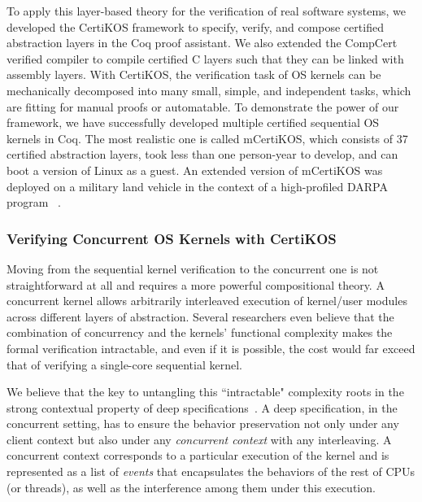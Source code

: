 \documentclass[a4paper, 10pt]{article}
\begin{document}
\begin{small}
To apply this layer-based theory for the verification of real software systems,
we developed the CertiKOS framework to  specify,  verify,  and compose certified abstraction layers  in the Coq proof assistant.
We also extended
the CompCert verified compiler to compile certified C layers such
that they can be linked with assembly layers.
With CertiKOS, the verification task of OS kernels
can be mechanically decomposed into many small, simple, and
independent tasks, which are fitting for manual proofs or automatable.
To demonstrate the power of our  framework,
 we have successfully developed multiple certified
sequential OS kernels in Coq. 
The most realistic one is called mCertiKOS,
which consists of 37 certified abstraction layers, 
took less than one person-year to develop,
and can boot a version of Linux as a guest.
An extended version of mCertiKOS was deployed on a military land vehicle in the context of a high-profiled  DARPA program
~\cite{hacms}.

\subsubsection*{\small Verifying Concurrent OS Kernels with CertiKOS}
Moving from the sequential kernel verification
to the concurrent one is not straightforward at all
and requires a more powerful compositional theory.
A concurrent kernel allows arbitrarily  interleaved
execution of kernel/user modules across different
layers of abstraction. 
Several researchers even believe that the combination of concurrency and the kernels' functional complexity makes the formal verification intractable,
and even if it is possible, the cost would far exceed that of
verifying a single-core sequential kernel.

We believe that the key to untangling this ``intractable" complexity roots in the
strong contextual property of deep specifications~\cite{osdi16-gu}.
A deep specification, in the concurrent setting, has to ensure   the behavior preservation not only under any client context but also under
any \emph{concurrent context} with any interleaving.
A  concurrent context corresponds to
a particular execution of the kernel  and is represented as a list of \emph{events} that encapsulates the behaviors of the rest of CPUs (or threads), as well as the interference
among them under this  execution.


\end{small}
\end{document}
